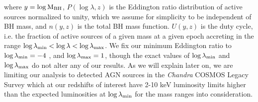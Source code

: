 where $y=\log {\rm M}_{\rm BH}$, $P(\log \lambda,z)$ is the Eddington ratio distribution of active sources normalized to unity, which we assume for simplicity to be independent of BH mass, and $n(y,z)$ is the total BH mass function. $U(y,z)$ is the duty cycle, i.e. the fraction of active sources of a given mass at a given epoch accreting in the range $\log \lambda_{\rm min}<\log \lambda<\log \lambda_{\rm max}$. We fix our minimum Eddington ratio to $\log \lambda_{\rm min}=-4$ %
, and $\log \lambda_{\rm max}=1$, though the exact values of $\log \lambda_{\rm min}$ and $\log \lambda_{\rm max}$ do not alter any of our results. As we will explain later on, we are limiting our analysis to detected AGN sources in the \textit{Chandra} COSMOS Legacy Survey \citep[COSMOS-Legacy,][]{2016ApJ...819...62C} which at our redshifts of interest have 2-10 keV luminosity limits higher than the expected luminosities at $\log \lambda_{\rm min}$ for the mass ranges into consideration.

